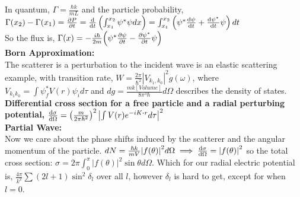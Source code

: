 \documentclass[10pt,landscape,a4paper]{article}
\newcommand{\minititle}[1]{\textbf{#1:}\\}
\renewcommand{\^}[1]{\ensuremath{\hat{#1}}}
\newcommand{\h}{\hbar}
\renewcommand{\-}[1]{\text{\sout{\ensuremath{#1}}}}
\begin{document}
\begin{multicols}{4}
	In quantum, $ \Gamma = \frac{\h k}{mL} $ and the particle probability, $ \Gamma(x_2)-\Gamma(x_1) = \pdv{P}{t} = \dv{t}\left(\int_{x_1}^{x_2}\psi^*\psi dx\right) = \int_{x_1}^{x_2}\left(\psi^*\pagebreak\dv{\psi}{t}+\dv{\psi^*}{t}\psi\right)dt $\\
	So the flux is, $ \Gamma(x) = -\frac{i\h}{2m}\qty(\psi^*\pdv{\psi}{t}-\pdv{\psi^*}{t}\psi) $\\
	\minititle{Born Approximation}
	The scatterer is a perturbation to the incident wave is an elastic scattering example, with transition rate, $ W = \frac{2\pi}{\h^2}|V_{k_1,k_0}|^2 g(\omega) $, where $ V_{k_1 k_0} = \int\psi^*_f V(r)\psi_i d\tau $ and $ dg = \frac{mk\left[Volume\right]}{8\pi^3\h}d\Omega $ describes the density of states.\\
	\textbf{Differential cross section for a free particle and a radial perturbing potential,} $ \dv{\sigma}{\Omega} (\theta,\phi) = \left(\frac{m}{2\pi\h^2}\right)^2\left|\int V(r)e^{-iK\vdot r}d\tau \right|^2 $\\
	\minititle{Partial Wave}
	Now we care about the phase shifts induced by the scatterer and the angular momentum of the particle. $ dN = \frac{\h k}{mV}\abs{f(\theta)}^2d\Omega \implies \dv{\sigma}{\Omega} = \abs{f(\theta)}^2 $ so the total cross section: $ \sigma = 2\pi\int_0^\pi |f(\theta)|^2\sin\theta d\Omega $. Which for our radial electric potential is, $ \frac{4\pi}{k^2}\sum(2l+1)\sin^2\delta_l $ over all $ l $, however $ \delta_l $ is hard to get, except for when $ l=0 $.
	
	\end{multicols}
\end{document}
